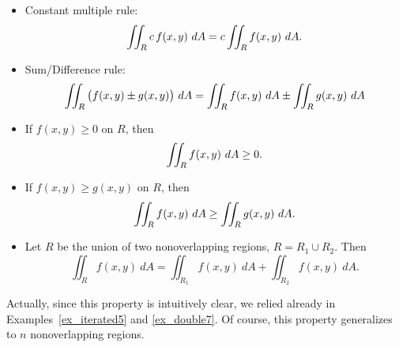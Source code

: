 \begin{itemize}
	\item Constant multiple rule:
	$$\displaystyle \iint_Rc\,f(x,y)\ dA = c\iint_Rf(x,y)\ dA.$$
	\item Sum/Difference rule:	
	$$\ds \iint_R \big(f(x,y)\pm g(x,y)\big)\ dA = \iint_R f(x,y)\ dA \pm \iint_R g(x,y)\ dA $$
	\item	If $f(x,y)\geq 0$ on $R$, then $$\displaystyle \iint_R f(x,y)\ dA\geq 0.$$
	\item	If $f(x,y)\geq g(x,y)$ on $R$, then $$\displaystyle \iint_R f(x,y)\ dA\geq \iint_R g(x,y)\ dA.$$
	\item Let $R$ be the union of two nonoverlapping regions, $R = R_1\cup R_2$. Then 
	$$\iint_R f(x,y)\ dA = \iint_{R_1}f(x,y)\ dA+ \iint_{R_2}f(x,y)\ dA.$$
\end{itemize}
Actually, since this property is intuitively clear, we relied already in Examples~\ref{ex_iterated5} and \ref{ex_double7}. Of course, this property generalizes to $n$ nonoverlapping regions.


